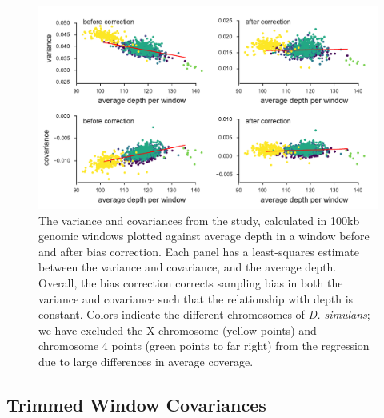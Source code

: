 \documentclass[11pt]{article}
\begin{document}
\begin{figure}[!ht]
  \centering
  \includegraphics[]{figures/barghi-correction-plot.pdf}

  \caption{The variance and covariances from the \textcite{Barghi2019-qy}
    study, calculated in 100kb genomic windows plotted against average depth in
    a window before and after bias correction.  Each panel has a least-squares
    estimate between the variance and covariance, and the average depth.
    Overall, the bias correction corrects sampling bias in both the variance
    and covariance such that the relationship with depth is constant. Colors
    indicate the different chromosomes of \emph{D. simulans}; we have excluded
  the X chromosome (yellow points) and chromosome 4 points (green points to far
right) from the regression due to large differences in average coverage.}

  \label{suppfig:barghi-correction}
\end{figure}

\subsection{\textcite{Barghi2019-qy} Trimmed Window Covariances}
\end{document}
